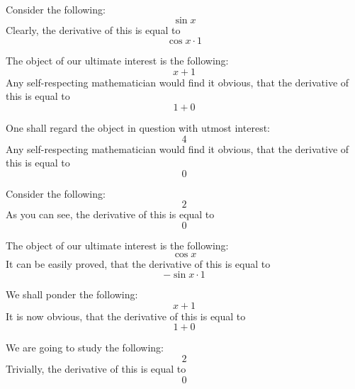 \documentclass{article}
\begin{document}
Consider the following:
\begin{equation}
\sin x 
\end{equation}
Clearly, the derivative of this is equal to
\begin{equation}
\cos x \cdot 1 
\end{equation}

The object of our ultimate interest is the following:
\begin{equation}
x + 1 
\end{equation}
Any self-respecting mathematician would find it obvious, that the derivative of this is equal to
\begin{equation}
1 + 0 
\end{equation}

One shall regard the object in question with utmost interest:
\begin{equation}
4 
\end{equation}
Any self-respecting mathematician would find it obvious, that the derivative of this is equal to
\begin{equation}
0 
\end{equation}

Consider the following:
\begin{equation}
2 
\end{equation}
As you can see, the derivative of this is equal to
\begin{equation}
0 
\end{equation}

The object of our ultimate interest is the following:
\begin{equation}
\cos x 
\end{equation}
It can be easily proved, that the derivative of this is equal to
\begin{equation}
-\sin x \cdot 1 
\end{equation}

We shall ponder the following:
\begin{equation}
x + 1 
\end{equation}
It is now obvious, that the derivative of this is equal to
\begin{equation}
1 + 0 
\end{equation}

We are going to study the following:
\begin{equation}
2 
\end{equation}
Trivially, the derivative of this is equal to
\begin{equation}
0 
\end{equation}
\end{document}
